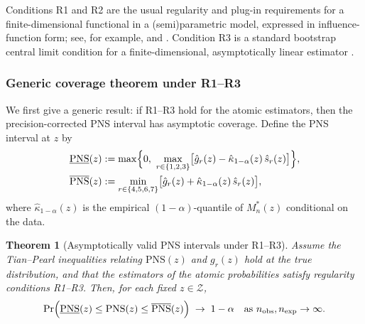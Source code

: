 \documentclass[accepted]{uai2026} %
\theoremstyle{plain}
\newtheorem{theorem}{Theorem}[section]
\theoremstyle{definition}
\theoremstyle{remark}
\begin{document}
Conditions R1 and R2 are the usual regularity and plug-in requirements for a
finite-dimensional functional in a (semi)parametric model, expressed in
influence-function form; see, for example, \citep{bickel1993efficient}
and \citep{vandervaart1998asymptotic}. Condition R3 is a standard
bootstrap central limit condition for a finite-dimensional, asymptotically
linear estimator \citep{vandervaart1998asymptotic,chernozhukov2013gaussian}.

\subsubsection{Generic coverage theorem under R1--R3}
\label{subsubsec:generic-theorem}

We first give a generic result: if R1--R3 hold for the atomic estimators, then
the precision-corrected PNS interval has asymptotic coverage. Define the PNS interval at $z$ by
\begin{align}
  \underline{\mathrm{PNS}}(z)
  &:= \max\Bigl\{
    0,\
    \max_{r \in \{1,2,3\}}
      \bigl[\hat g_r(z) - \hat \kappa_{1-\alpha}(z)\,\hat s_r(z)\bigr]
  \Bigr\}, \label{eq:pns-lower-corrected}\\
  \overline{\mathrm{PNS}}(z)
  &:= \min_{r \in \{4,5,6,7\}}
      \bigl[\hat g_r(z) + \hat \kappa_{1-\alpha}(z)\,\hat s_r(z)\bigr], \label{eq:pns-upper-corrected}
\end{align}
where $\hat \kappa_{1-\alpha}(z)$ is the empirical $(1-\alpha)$-quantile of
$M_n^*(z)$ conditional on the data.

\begin{theorem}[Asymptotically valid PNS intervals under R1--R3]
\label{thm:pns-R1R3}
Assume the Tian--Pearl inequalities relating $\mathrm{PNS}(z)$ and $g_r(z)$
hold at the true distribution, and that the estimators of the atomic
probabilities satisfy regularity conditions R1--R3. Then, for each fixed
$z \in \mathcal{Z}$,
\[
  \Pr\Bigl(
    \underline{\mathrm{PNS}}(z)
    \le \mathrm{PNS}(z)
    \le \overline{\mathrm{PNS}}(z)
  \Bigr)
  \;\to\; 1 - \alpha
  \quad \text{as } n_{\mathrm{obs}}, n_{\mathrm{exp}} \to \infty.
\]
\end{theorem}
\end{document}
